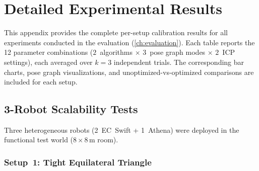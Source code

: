 \chapter{Detailed Experimental Results}
\label{ch:appendix_results}

This appendix provides the complete per-setup calibration results
for all experiments conducted in the evaluation
(\autoref{ch:evaluation}).
Each table reports the 12 parameter combinations
($2$~algorithms $\times$ $3$~pose graph modes $\times$ $2$~ICP
settings), each averaged over $k = 3$ independent trials.
The corresponding bar charts, pose graph visualizations, and
unoptimized-vs-optimized comparisons are included for each setup.

\section{3-Robot Scalability Tests}
\label{sec:app_3robots}

Three heterogeneous robots (2~EC~Swift + 1~Athena) were deployed in
the functional test world ($8 \times 8$\,m room).

\subsection{Setup~1: Tight Equilateral Triangle}

